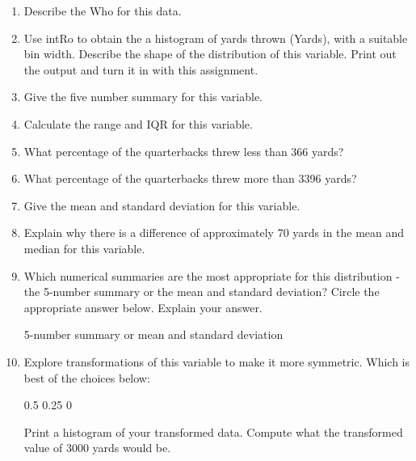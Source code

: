 \documentclass{article}[11pt]
\begin{document}
\begin{enumerate}
\begin{enumerate}
\item Describe the Who for this data.\\
\item Use intRo to obtain the a histogram of yards thrown (Yards), with a suitable bin width.  Describe the shape of the distribution of this variable. Print out the output and turn it in with this assignment.
\item Give the five number summary for this variable.\\
\item Calculate the range and IQR for this variable.\\
\item What percentage of the quarterbacks  threw less than 366 yards? \\
\item What percentage of the quarterbacks  threw more than 3396 yards?  \\
\item Give the mean and standard deviation for this variable.\\
\item Explain why there is a difference of approximately 70 yards in the mean and median for this variable.\\
\item Which numerical summaries are the most appropriate for this distribution - the 5-number summary or the mean and standard deviation?  Circle the appropriate answer below.  Explain your answer.

\hspace{1in} 5-number summary \hspace{1in} or   \hspace{1in} mean and standard deviation \\

\item Explore transformations of this variable to make it more symmetric. Which is best of the choices below:

\hspace{1in} 0.5 \hspace{1in} 0.25 \hspace{1in} 0

Print a histogram of your transformed data. Compute what the transformed value of 3000 yards would be. 

\end{enumerate}

\end{enumerate}
\end{document}
